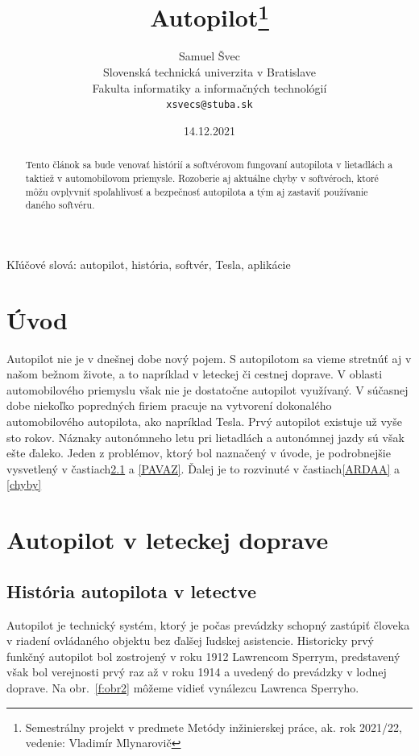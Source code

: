 \documentclass[10pt,twoside,slovak,a4paper]{article}
\title{Autopilot\thanks{Semestrálny projekt v predmete Metódy inžinierskej práce, ak. rok 2021/22, vedenie: Vladimír Mlynarovič}} %
\author{Samuel Švec\\[2pt]
	{\small Slovenská technická univerzita v Bratislave}\\
	{\small Fakulta informatiky a informačných technológií}\\
	{\small \texttt{xsvecs@stuba.sk}}
	}
\date{\small 14.12.2021} %
\begin{document}
\maketitle

\begin{abstract}
Tento článok sa bude venovať histórií a softvérovom fungovaní autopilota v lietadlách a taktiež v automobilovom priemysle. Rozoberie aj aktuálne chyby v softvéroch, ktoré môžu ovplyvniť spoľahlivosť a bezpečnosť autopilota a tým aj zastaviť používanie daného softvéru.
\end{abstract}

Kľúčové slová: autopilot, história, softvér, Tesla, aplikácie

\section{Úvod}

Autopilot nie je v dnešnej dobe nový pojem. S autopilotom sa vieme stretnúť aj v našom bežnom živote, a to napríklad v leteckej či cestnej doprave. V oblasti automobilového priemyslu však nie je dostatočne autopilot využívaný. V súčasnej dobe niekoľko popredných firiem pracuje na vytvorení dokonalého automobilového autopilota, ako napríklad Tesla. Prvý autopilot existuje už vyše sto rokov. Náznaky autonómneho letu pri lietadlách a autonómnej jazdy sú však ešte ďaleko. Jeden z problémov, ktorý bol naznačený v úvode, je podrobnejšie vysvetlený v častiach\ref{ALD} a \ref{PAVAZ}.
Ďalej je to rozvinuté v častiach\ref{ARDAA} a \ref{chyby}


\section{Autopilot v leteckej doprave} 

\subsection{História autopilota v letectve} \label{ALD}

Autopilot je technický systém, ktorý je počas prevádzky schopný zastúpiť človeka v riadení ovládaného objektu bez ďalšej ľudskej asistencie. Historicky prvý funkčný autopilot bol zostrojený v roku 1912 Lawrencom Sperrym, predstavený však bol verejnosti prvý raz až v roku 1914 a uvedený do prevádzky v lodnej doprave.\cite{HistoryAutopilot} Na obr.~\ref{f:obr2} môžeme vidieť vynálezcu Lawrenca Sperryho.
\end{document}
